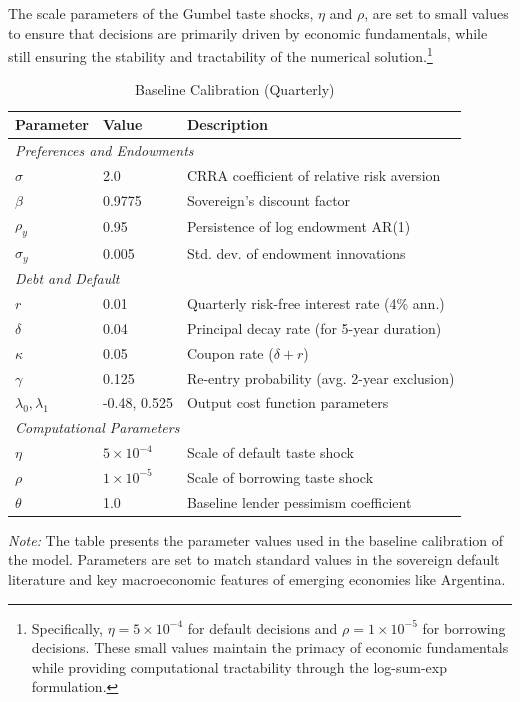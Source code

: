 \documentclass[12pt]{article}
\theoremstyle{plain}
\begin{document}
The scale parameters of the Gumbel taste shocks, $\eta$ and $\rho$, are set to
small values to ensure that decisions are primarily driven by economic
fundamentals, while still ensuring the stability and tractability of the
numerical solution.\footnote{Specifically, $\eta = 5 \times 10^{-4}$ for
	default decisions and $\rho = 1 \times 10^{-5}$ for borrowing decisions. These
	small values maintain the primacy of economic fundamentals while providing
	computational tractability through the log-sum-exp formulation.}

\begin{table}[h!]
	\centering
	\caption{Baseline Calibration (Quarterly)}
	\label{tab:calibration}
	\begin{tabular}{@{}lll@{}}
		\toprule
		Parameter              & Value              & Description                                  \\ \midrule
		\multicolumn{3}{l}{\textit{Preferences and Endowments}}                                    \\
		$\sigma$               & 2.0                & CRRA coefficient of relative risk aversion   \\
		$\beta$                & 0.9775             & Sovereign's discount factor                  \\
		$\rho_y$               & 0.95               & Persistence of log endowment AR(1)           \\
		$\sigma_y$             & 0.005              & Std. dev. of endowment innovations           \\
		\multicolumn{3}{l}{\textit{Debt and Default}}                                              \\
		$r$                    & 0.01               & Quarterly risk-free interest rate (4\% ann.) \\
		$\delta$               & 0.04               & Principal decay rate (for 5-year duration)   \\
		$\kappa$               & 0.05               & Coupon rate ($\delta+r$)                     \\
		$\gamma$               & 0.125              & Re-entry probability (avg. 2-year exclusion) \\
		$\lambda_0, \lambda_1$ & -0.48, 0.525       & Output cost function parameters              \\
		\multicolumn{3}{l}{\textit{Computational Parameters}}                                      \\
		$\eta$                 & $5 \times 10^{-4}$ & Scale of default taste shock                 \\
		$\rho$                 & $1 \times 10^{-5}$ & Scale of borrowing taste shock               \\
		$\theta$               & 1.0                & Baseline lender pessimism coefficient        \\ \bottomrule
	\end{tabular}
	\parbox{\linewidth}{\small\textit{Note:} The table presents the parameter values used in the baseline calibration of the model. Parameters are set to match standard values in the sovereign default literature and key macroeconomic features of emerging economies like Argentina.}


\end{table}
\end{document}
